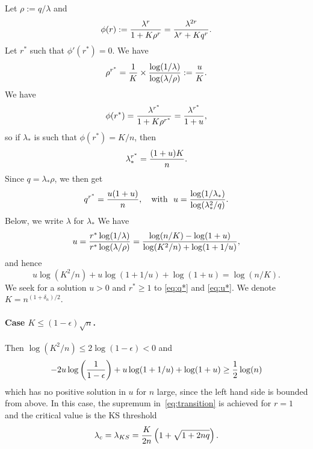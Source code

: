 \documentclass[final]{colt2026}
\newcommand{\1}{\mathbf{1}}
\newcommand{\pa}[1]{\left(#1\right)}
\begin{document}
Let $\rho:=q/\lambda$ and
$$\phi(r):= {\lambda^r\over 1+K \rho^r}= {\lambda^{2r}\over \lambda^r+K q^r}.$$
Let $r^*$ such that $\phi'(r^*)=0$.
We have
\begin{equation}\label{eq:r*}
\rho^{r^*}= {1\over K}\times{\log(1/\lambda)\over  \log(\lambda/\rho)}:={u\over K}.
\end{equation}
We have
$$\phi(r^*)= {\lambda^{r^*}\over 1+K \rho^{r^*}}=  {\lambda^{r^*}\over 1+u},$$
so if  $\lambda_{*}$ is such that $\phi(r^*)=K/n$, then 
\begin{equation}\label{eq:lambda*}
\lambda_{*}^{r^*}={(1+u)K\over n}.
\end{equation}
Since $q=\lambda_{*} \rho$, we then get
\begin{equation}\label{eq:q*}
q^{r^*}={u(1+u)\over n},\quad \text{with}\ \ u={\log(1/\lambda_{*})\over  \log(\lambda_{*}^2/q)}.
\end{equation}
Below, we write $\lambda$ for $\lambda_{*}$
We have
$$u={r^*\log(1/\lambda)\over r^* \log(\lambda/\rho)}={\log(n/K)-\log(1+u)\over \log(K^2/n)+\log(1+1/u)},
$$
and hence
\begin{equation}\label{eq:u*}
u \log(K^2/n)+u\log(1+1/u)+\log(1+u)=\log(n/K).
\end{equation}
We seek for  a solution $u>0$ and $r^*\geq 1$ to \eqref{eq:q*} and \eqref{eq:u*}.
We denote $K=n^{(1+\delta_{n})/2}$.

\paragraph{Case $K\leq (1-\epsilon)\sqrt{n}$.} 
Then $\log(K^2/n)\leq  2\log(1-\epsilon)<0$ and  
$$-2u\log\pa{1\over 1-\epsilon}+u\log(1+1/u)+\log(1+u)\geq {1\over 2}\log(n) $$
which has no positive solution in $u$ for $n$ large, since the left hand side is bounded from above.
In this case, the supremum in~\eqref{eq:transition} is achieved for $r=1$ and the critical value is the KS threshold
$$\lambda_{c}=\lambda_{KS}= {K\over 2n} \pa{1+\sqrt{1+2nq}}.$$
\end{document}
